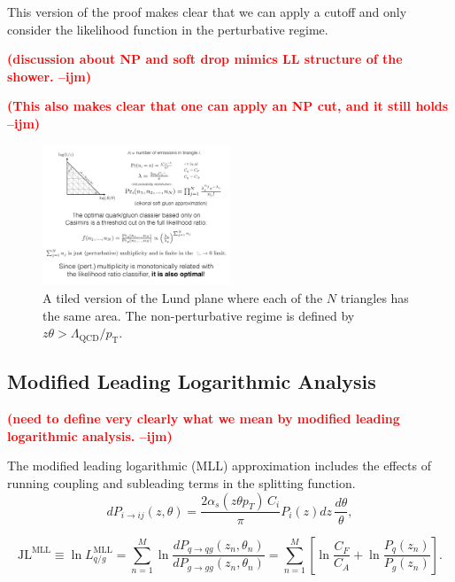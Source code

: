 \documentclass[letterpaper,11pt]{article}
\newcommand{\ijm}[1]{\marginpar{\raggedright\scriptsize\textbf{\textcolor{red}{ijm}}}  \textbf{\textcolor{red}{(#1 --ijm)}}}
\begin{document}
This version of the proof makes clear that we can apply a cutoff and only consider the likelihood function in the perturbative regime.

\ijm{discussion about NP and soft drop mimics LL structure of the shower.}

\ijm{This also makes clear that one can apply an NP cut, and it still holds}

\begin{figure}[t]
\centering
\includegraphics[width=0.5\textwidth]{figures/LundPlaneSchematic.pdf}
\caption{A tiled version of the Lund plane where each of the $N$ triangles has the same area.  The non-perturbative regime is defined by $z\theta>\Lambda_\text{QCD}/p_\text{T}$.}
\label{fig:lundschematic}
\end{figure}


\subsection{Modified Leading Logarithmic Analysis}

\ijm{need to define very clearly what we mean by modified leading logarithmic analysis.}

The modified leading logarithmic (MLL) approximation includes the effects of running coupling and subleading terms in the splitting function.
\begin{equation}
\label{eq:LLemit}
dP_{i\to i j}(z,\theta) = \frac{2\alpha_s (z\theta p_T) \, C_i}{\pi} P_{i}(z) dz\,\frac{d\theta}{\theta},
\end{equation}



\begin{equation}
\label{eq:MLLLL}
\text{JL}^\text{MLL} \equiv \ln L_{q/g}^\text{MLL} = \sum_{n=1}^M \ln \frac{dP_{q\to qg}(z_n,\theta_n)}{dP_{g\to gg}(z_n,\theta_n)} = \sum_{n=1}^M\left[\ln \frac{C_F}{C_A} + \ln \frac{P_q(z_n)}{P_g(z_n)} \right].
\end{equation}
\end{document}

